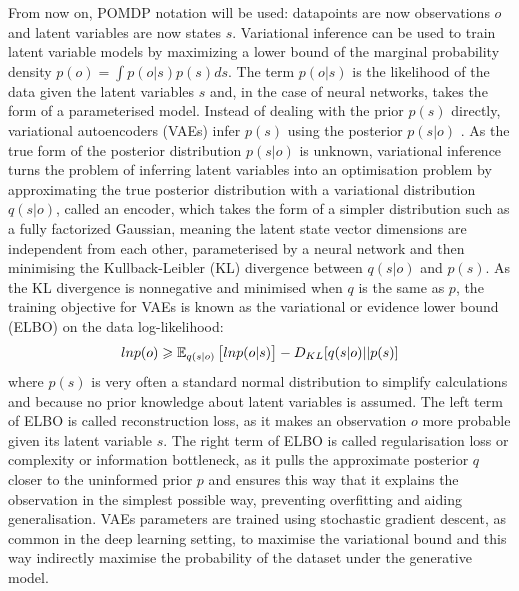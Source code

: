 From now on, POMDP notation will be used: datapoints are now observations $o$ and latent variables are now states $s$. Variational inference can be used to train latent variable models by maximizing a lower bound of the marginal probability density $p(o) = \int p(o|s)p(s)ds$. The term $p(o|s)$ is the likelihood of the data given the latent variables $s$ and, in the case of neural networks, takes the form of a parameterised model. Instead of dealing with the prior $p(s)$ directly, variational autoencoders (VAEs) infer $p(s)$ using the posterior $p(s|o)$ \cite{Algo.VAE}. As the true form of the posterior distribution $p(s|o)$ is unknown, variational inference turns the problem of inferring latent variables into an optimisation problem by approximating the true posterior distribution with a variational distribution $q(s|o)$, called an encoder, which takes the form of a simpler distribution such as a fully factorized Gaussian, meaning the latent state vector dimensions are independent from each other, parameterised by a neural network and then minimising the Kullback-Leibler (KL) divergence between $q(s|o)$ and $p(s)$. As the KL divergence is nonnegative and minimised when $q$ is the same as $p$, the training objective for VAEs is known as the variational or evidence lower bound (ELBO) on the data log-likelihood:
$$ln p(o) \geqslant \operatorname{\mathbb{E}}_{q(s|o)}\big[ ln p(o|s) \big] - D_{KL}[q(s|o)||p(s)]$$
where $p(s)$ is very often a standard normal distribution to simplify calculations and because no prior knowledge about latent variables is assumed. The left term of ELBO is called reconstruction loss, as it makes an observation $o$ more probable given its latent variable $s$. The right term of ELBO is called regularisation loss or complexity or information bottleneck, as it pulls the approximate posterior $q$ closer to the uninformed prior $p$ and ensures this way that it explains the observation in the simplest possible way, preventing overfitting and aiding generalisation. VAEs parameters are trained using stochastic gradient descent, as common in the deep learning setting, to maximise the variational bound and this way indirectly maximise the probability of the dataset under the generative model.

